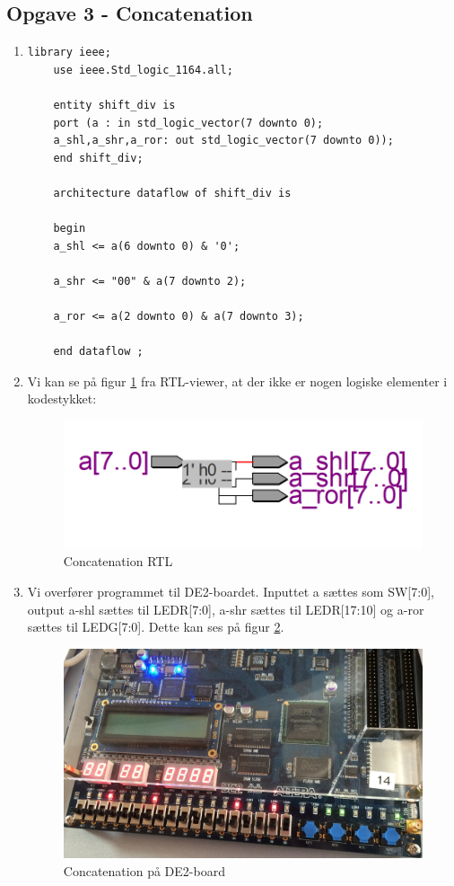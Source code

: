 \newpage
\subsection{Opgave 3 - Concatenation}
\begin{enumerate}
	\item[1)]
		\begin{lstlisting}[caption={Concatenation kode},label={lst:ConcatenationCode}]
	library ieee;
	use ieee.Std_logic_1164.all;
	
	entity shift_div is
	port (a : in std_logic_vector(7 downto 0);
	a_shl,a_shr,a_ror: out std_logic_vector(7 downto 0));
	end shift_div; 
	
	architecture dataflow of shift_div is
	
	begin 
	a_shl <= a(6 downto 0) & '0';
	
	a_shr <= "00" & a(7 downto 2);
	
	a_ror <= a(2 downto 0) & a(7 downto 3);
	
	end dataflow ;

		\end{lstlisting}
	\item[2)]
Vi kan se på figur \ref{fig:concatenationRTL} fra RTL-viewer, at der ikke er nogen logiske elementer i kodestykket:
	\begin{figure}[H]
		\centering
		\includegraphics[scale=0.5]{pictures/Oevelse3/Concatenation_RTL.png}
		\caption{Concatenation RTL}
		\label{fig:concatenationRTL}
	\end{figure}

	
	\item[3)]
Vi overfører programmet til DE2-boardet. Inputtet a sættes som SW[7:0], output a-shl sættes til LEDR[7:0], a-shr sættes til LEDR[17:10] og a-ror sættes til LEDG[7:0]. Dette kan ses på figur \ref{fig:concatenation_DE2board}.

	\begin{figure}[H]
		\centering
		\includegraphics[scale=0.23]{pictures/Oevelse3/Concatenation_DE2board.jpg}
		\caption{Concatenation på DE2-board}
		\label{fig:concatenation_DE2board}
	\end{figure}

\end{enumerate}